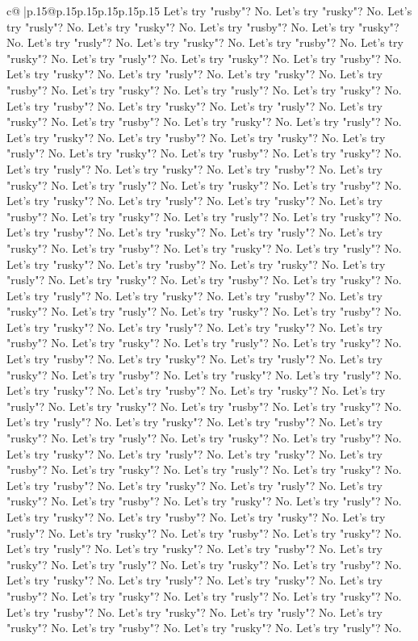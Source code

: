 \documentclass{article}
\begin{document}
{\begin{supertabular}{c@{$\;$}|p{.15\linewidth}@{}p{.15\linewidth}p{.15\linewidth}p{.15\linewidth}p{.15\linewidth}p{.15\linewidth}}
{{{Let's try "rusby"? No. Let's try "rusky"? No. Let's try "rusly"? No. Let's try "rusky"? No. Let's try "rusby"? No. Let's try "rusky"? No. Let's try "rusly"? No. Let's try "rusky"? No. Let's try "rusby"? No. Let's try "rusky"? No. Let's try "rusly"? No. Let's try "rusky"? No. Let's try "rusby"? No. Let's try "rusky"? No. Let's try "rusly"? No. Let's try "rusky"? No. Let's try "rusby"? No. Let's try "rusky"? No. Let's try "rusly"? No. Let's try "rusky"? No. Let's try "rusby"? No. Let's try "rusky"? No. Let's try "rusly"? No. Let's try "rusky"? No. Let's try "rusby"? No. Let's try "rusky"? No. Let's try "rusly"? No. Let's try "rusky"? No. Let's try "rusby"? No. Let's try "rusky"? No. Let's try "rusly"? No. Let's try "rusky"? No. Let's try "rusby"? No. Let's try "rusky"? No. Let's try "rusly"? No. Let's try "rusky"? No. Let's try "rusby"? No. Let's try "rusky"? No. Let's try "rusly"? No. Let's try "rusky"? No. Let's try "rusby"? No. Let's try "rusky"? No. Let's try "rusly"? No. Let's try "rusky"? No. Let's try "rusby"? No. Let's try "rusky"? No. Let's try "rusly"? No. Let's try "rusky"? No. Let's try "rusby"? No. Let's try "rusky"? No. Let's try "rusly"? No. Let's try "rusky"? No. Let's try "rusby"? No. Let's try "rusky"? No. Let's try "rusly"? No. Let's try "rusky"? No. Let's try "rusby"? No. Let's try "rusky"? No. Let's try "rusly"? No. Let's try "rusky"? No. Let's try "rusby"? No. Let's try "rusky"? No. Let's try "rusly"? No. Let's try "rusky"? No. Let's try "rusby"? No. Let's try "rusky"? No. Let's try "rusly"? No. Let's try "rusky"? No. Let's try "rusby"? No. Let's try "rusky"? No. Let's try "rusly"? No. Let's try "rusky"? No. Let's try "rusby"? No. Let's try "rusky"? No. Let's try "rusly"? No. Let's try "rusky"? No. Let's try "rusby"? No. Let's try "rusky"? No. Let's try "rusly"? No. Let's try "rusky"? No. Let's try "rusby"? No. Let's try "rusky"? No. Let's try "rusly"? No. Let's try "rusky"? No. Let's try "rusby"? No. Let's try "rusky"? No. Let's try "rusly"? No. Let's try "rusky"? No. Let's try "rusby"? No. Let's try "rusky"? No. Let's try "rusly"? No. Let's try "rusky"? No. Let's try "rusby"? No. Let's try "rusky"? No. Let's try "rusly"? No. Let's try "rusky"? No. Let's try "rusby"? No. Let's try "rusky"? No. Let's try "rusly"? No. Let's try "rusky"? No. Let's try "rusby"? No. Let's try "rusky"? No. Let's try "rusly"? No. Let's try "rusky"? No. Let's try "rusby"? No. Let's try "rusky"? No. Let's try "rusly"? No. Let's try "rusky"? No. Let's try "rusby"? No. Let's try "rusky"? No. Let's try "rusly"? No. Let's try "rusky"? No. Let's try "rusby"? No. Let's try "rusky"? No. Let's try "rusly"? No. Let's try "rusky"? No. Let's try "rusby"? No. Let's try "rusky"? No. Let's try "rusly"? No. Let's try "rusky"? No. Let's try "rusby"? No. Let's try "rusky"? No. Let's try "rusly"? No. Let's try "rusky"? No. Let's try "rusby"? No. Let's try "rusky"? No. Let's try "rusly"? No. Let's try "rusky"? No. Let's try "rusby"? No. Let's try "rusky"? No. Let's try "rusly"? No. Let's try "rusky"? No. Let's try "rusby"? No. Let's try "rusky"? No. Let's try "rusly"? No. Let's try "rusky"? No. Let's try "rusby"? No. Let's try "rusky"? No. Let's try "rusly"? No. }}}
\end{supertabular}}
\end{document}
